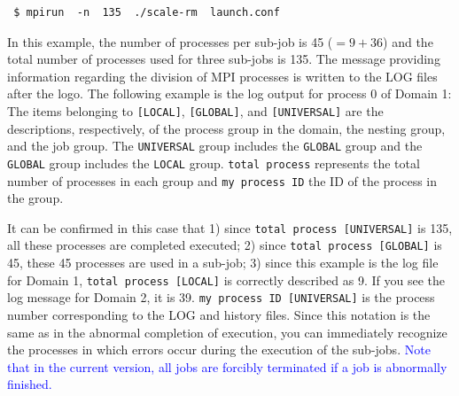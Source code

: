 \begin{verbatim}
 $ mpirun  -n  135  ./scale-rm  launch.conf
\end{verbatim}
In this example, the number of processes per sub-job is 45 ($=9 + 36$) and the total number of processes used for three sub-jobs is 135. The message providing information regarding the division of MPI processes is written to the LOG files after the \scalelib logo. The following example is the log output for process 0 of Domain 1:
The items belonging to \verb|[LOCAL]|, \verb|[GLOBAL]|, and \verb|[UNIVERSAL]| are the descriptions, respectively, of the process group in the domain, the nesting group, and the job group. The \verb|UNIVERSAL| group includes the \verb|GLOBAL| group and the \verb|GLOBAL| group includes the \verb|LOCAL| group. \verb|total process| represents the total number  of processes in each group and \verb|my process ID| the ID of the process in the group.

It can be confirmed in this case that 1) since \verb|total process [UNIVERSAL]| is 135, all these processes are completed executed; 2) since \verb|total process [GLOBAL]| is 45, these 45 processes are used in a sub-job; 3) since this example is the log file for Domain 1,  \verb|total process [LOCAL]| is correctly described as 9. If you see the log message for Domain 2,  it is 39. \verb|my process ID [UNIVERSAL]|  is the process number  corresponding to the LOG and history files. Since this notation is the same as in the abnormal completion of execution, you can immediately recognize the processes in which errors occur during the execution of the sub-jobs. \textcolor{blue}{Note that in the current version, all jobs are forcibly terminated if a job is abnormally finished.}



